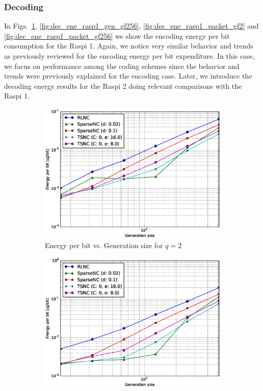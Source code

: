 \subsubsection{Decoding}
In Figs.~\ref{fig:dec_ene_rasp1_gen_gf2}, \ref{fig:dec_ene_rasp1_gen_gf256},
\ref{fig:dec_ene_rasp1_packet_gf2} and \ref{fig:dec_ene_rasp1_packet_gf256} 
we show the encoding energy per bit consumption for the \ac{Raspi} 1.
Again, we notice very similar behavior and trends as previously
reviewed for the encoding energy per bit expenditure. In this case,
we focus on performance among the coding schemes since the behavior 
and trends were previously explained for the encoding case. Later,
we introduce the decoding energy results for the \ac{Raspi} 2 doing
relevant comparisons with the \ac{Raspi} 1.
%
\begin{figure}
    \centering
    \begin{subfigure}[b]{0.475\textwidth}
        \centering
        \includegraphics[width=1.05\textwidth]{images/06_06_2016/energy_per_bit_vs_generation_size_Rasp_Binary_decoder_1600.eps}
        \caption[]%
        {{\small Energy per bit vs. Generation size for $q = 2$}}
        \label{fig:dec_ene_rasp1_gen_gf2}
    \end{subfigure}
    \hfill
    \begin{subfigure}[b]{0.475\textwidth}
        \centering
        \includegraphics[width=1.05\textwidth]{images/06_06_2016/energy_per_bit_vs_generation_size_Rasp_Binary8_decoder_1600.eps}

\end{subfigure}
\end{figure}

